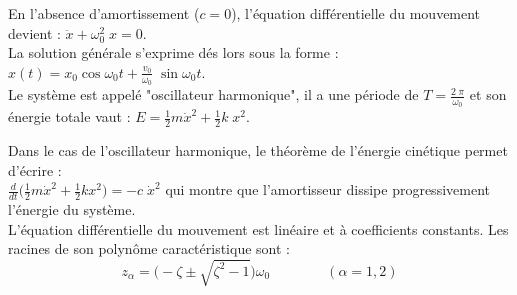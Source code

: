 \documentclass[a4paper]{article}
\begin{document}
\begin{itemize}
\begin{siderules}
En l'absence d'amortissement ($ c = 0 $), l'équation différentielle du mouvement devient : $\displaystyle \ddot{x} + \omega_0^2 \; x = 0 $. \\
La solution générale s'exprime dés lors sous la forme : $\displaystyle x(t) = x_0 \cos \omega_0 t + \frac{v_0}{\omega_0} \; \sin \omega_0 t $. \\
Le système est appelé "oscillateur harmonique", il a une période de $\displaystyle T = \frac{2 \; \pi}{\omega_0} $ et son énergie totale vaut : $\displaystyle E = \frac{1}{2} m \dot{x}^2 + \frac{1}{2} k \; x^2 $.
\end{siderules}

Dans le cas de l'oscillateur harmonique, le théorème de l'énergie cinétique permet d'écrire : \\
$\displaystyle \frac{d}{d t} \bigg( \frac{1}{2} m \dot{x}^2 + \frac{1}{2} k x^2 \bigg) = - c \; \dot{x}^2 $ qui montre que l'amortisseur dissipe progressivement l'énergie du système. \\
L'équation différentielle du mouvement est linéaire et à coefficients constants. Les racines de son polynôme caractéristique sont : 
\[ z_\alpha = \Big( - \zeta \pm \sqrt{\zeta^2 - 1} \Big) \omega_0 \qquad \qquad (\alpha = 1, 2) \]











\end{itemize}
\end{document}
